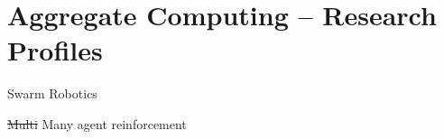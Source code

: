 \documentclass[presentation, 8pt]{beamer}\mode<presentation>{\usetheme{AMSBolognaFC}}
\begin{document}
\section{Aggregate Computing -- Research Profiles}
\begin{frame}{Swarm Robotics}

\end{frame}

\begin{frame}{\st{Multi} Many agent reinforcement}
\end{frame}
\section{}


\frame{\titlepage}

\section*{\refname}



\end{document}
